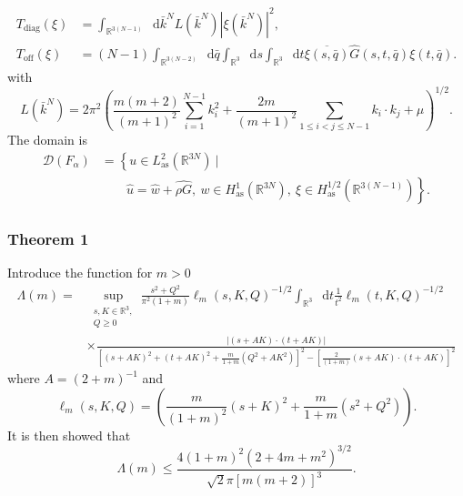 \documentclass{beamer}[10]
\newcommand{\abs}[1]{\left\lvert #1 \right\rvert}
\newcommand*\diff{\mathop{}\!\mathrm{d}}
\newcommand{\R}{\mathbb{R}}
\begin{document}
\begin{frame}
	\begin{equation}
	\begin{aligned}
	T_{\text{diag}}(\xi)&=\int_{\R^{3(N-1)}}\diff \bar{k}^N L(\bar{k}^N) \abs{\xi(\bar{k}^N)}^2,\\
	T_{\text{off}}(\xi)&=(N-1)\int_{\R^{3(N-2)}}\diff \bar{q}\int_{\R^3}\diff s\int_{\R^3}\diff t \overline{\xi(s,\bar{q})}\hat{G}(s,t,\bar{q})\xi(t,\bar{q}).
	\end{aligned}
	\end{equation} 
	with \small\begin{equation}
	L(\bar{k}^N)=2\pi^2\left(\frac{m(m+2)}{(m+1)^2}\sum_{i=1}^{N-1}k_i^2+\frac{2m}{(m+1)^2}\sum_{1\leq i<j\leq N-1}k_i\cdot k_j+\mu\right)^{1/2}.
	\end{equation}
	The domain is \begin{equation}
	\begin{aligned}
	\mathscr{D}(F_\alpha)&=\left\{u\in L_{\text{as}}^2(\R^{3N})\ \Big\vert\ \right.\\ &\qquad \left.\hat{u}=\hat{w}+\widehat{\rho G},\ w\in H_{\text{as}}^1(\R^{3N}),\ \xi\in H_{\text{as}}^{1/2}(\R^{3(N-1)}) \right\}.
	\end{aligned}
	\end{equation}
\end{frame}
\begin{frame}
	\frametitle{Theorem 1}
	Introduce the function for $ m>0 $ \tiny\begin{equation}
	\begin{aligned}
	\Lambda(m)=&\sup_{\substack{s,K\in\R^3,\\Q\geq0}}\frac{s^2+Q^2}{\pi^2(1+m)}\ell_m(s,K,Q)^{-1/2}\int_{\R^3}\diff t \frac{1}{t^2}\ell_m(t,K,Q)^{-1/2}\\
	&\times\frac{\abs{(s+AK)\cdot(t+AK)}}{\left[(s+AK)^2+(t+AK)^2+\frac{m}{1+m}(Q^2+AK^2)\right]^2-\left[\frac{2}{(1+m)}(s+AK)\cdot(t+AK)\right]^2}
	\end{aligned}
	\end{equation}
	\normalsize
	where $ A=(2+m)^{-1} $ and \begin{equation}
	\ell_m(s,K,Q)=\left(\frac{m}{(1+m)^2}(s+K)^2+\frac{m}{1+m}(s^2+Q^2)\right).
	\end{equation}
	It is then showed that \begin{equation}
	\Lambda(m)\leq\frac{4(1+m)^2(2+4m+m^2)^{3/2}}{\sqrt{2}\pi\left[m(m+2)\right]^3}.
	\end{equation}
\end{frame}
\end{document}
